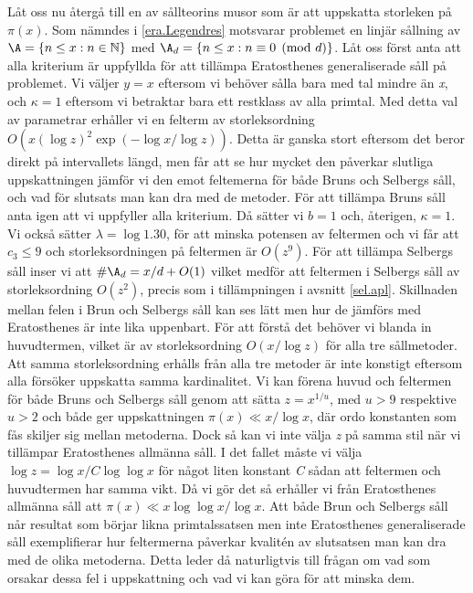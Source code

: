 Låt oss nu återgå till en av sållteorins musor som är att uppskatta storleken på \(\pi(x)\).
Som nämndes i \ref{era.Legendres} motsvarar problemet en linjär sållning av \(\A = \{n\leq x: n\in\mathbb{N}\}\) med \(\A_d = \{n\leq x: n \equiv 0 \pmod{d}\}\). Låt oss först anta att alla kriterium är uppfyllda för att tillämpa Eratosthenes generaliserade såll på problemet. 
Vi väljer \(y = x\) eftersom vi behöver sålla bara med tal mindre än \textit{x}, och \(\kappa = 1\) eftersom vi betraktar bara ett restklass av alla primtal. 
Med detta val av parametrar erhåller vi en felterm av storleksordning \(O(x(\log z)^2\exp({-\log x/\log z}))\).
Detta är ganska stort eftersom det beror direkt på intervallets längd, men får att se hur mycket den påverkar slutliga uppskattningen jämför vi den emot feltemerna för både Bruns och Selbergs såll, och vad för slutsats man kan dra med de metoder.
För att tillämpa Bruns såll anta igen att vi uppfyller alla kriterium. Då sätter vi \(b = 1\) och, återigen, \(\kappa = 1\). 
Vi också sätter \(\lambda = \log 1.30\), för att minska potensen av feltermen och vi får att \(c_3 \leq 9\) och storleksordningen på feltermen är \(O(z^9)\).
För att tillämpa Selbergs såll inser vi att \(\#\A_d = x/d + O(1)\) vilket medför att feltermen i Selbergs såll av storleksordning \(O(z^2)\), precis som i tillämpningen i avsnitt \ref{sel.apl}.
Skillnaden mellan felen i Brun och Selbergs såll kan ses lätt men hur de jämförs med Eratosthenes är inte lika uppenbart.
För att förstå det behöver vi blanda in huvudtermen, vilket är av storleksordning \(O(x/\log z)\) för alla tre sållmetoder.
Att samma storleksordning erhålls från alla tre metoder är inte konstigt eftersom alla försöker uppskatta samma kardinalitet.
Vi kan förena huvud och feltermen för både Bruns och Selbergs såll genom att sätta \(z = x^{1/u}\), med \(u > 9\) respektive \(u > 2\) och både ger uppskattningen \(\pi(x) \ll x/\log x\), där ordo konstanten som fås skiljer sig mellan metoderna. 
Dock så kan vi inte välja \textit{z} på samma stil när vi tillämpar Eratosthenes allmänna såll.
I det fallet måste vi välja \(\log z = \log x/C\log\log x\) för något liten konstant \textit{C} sådan att feltermen och huvudtermen har samma vikt.
Då vi gör det så erhåller vi från Eratosthenes allmänna såll att \(\pi(x) \ll x\log\log x/\log x\).
Att både Brun och Selbergs såll når resultat som börjar likna primtalssatsen men inte Eratosthenes generaliserade såll  exemplifierar hur feltermerna påverkar kvalitén av slutsatsen man kan dra med de olika metoderna.
Detta leder då naturligtvis till frågan om vad som orsakar dessa fel i uppskattning och vad vi kan göra för att minska dem.


